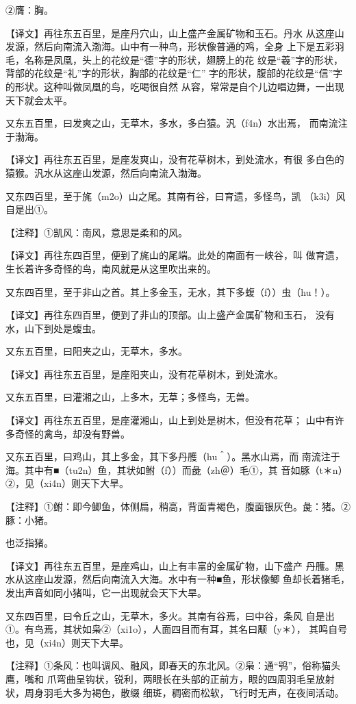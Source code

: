 \documentclass[a4paper,12pt,UTF8,twoside]{ctexbook}
\begin{document}
②膺：胸。

【译文】再往东五百里，是座丹穴山，山上盛产金属矿物和玉石。丹水 从这座山发源，然后向南流入渤海。山中有一种鸟，形状像普通的鸡，全身 上下是五彩羽毛，名称是凤凰，头上的花纹是“德”字的形状，翅膀上的花 纹是“羲”字的形状，背部的花纹是“礼”字的形状，胸部的花纹是“仁” 字的形状，腹部的花纹是“信”字的形状。这种叫做凤凰的鸟，吃喝很自然 从容，常常是自个儿边唱边舞，一出现天下就会太平。

又东五百里，曰发爽之山，无草木，多水，多白猿。汎（f4n）水出焉， 而南流注于渤海。

【译文】再往东五百里，是座发爽山，没有花草树木，到处流水，有很 多白色的猿猴。汎水从这座山发源，然后向南流入渤海。

又东四百里，至于旄（m2o）山之尾。其南有谷，曰育遗，多怪鸟，凯 （k3i）风自是出①。

【注释】①凯风：南风，意思是柔和的风。

【译文】再往东四百里，便到了旄山的尾端。此处的南面有一峡谷，叫 做育遗，生长着许多奇怪的鸟，南风就是从这里吹出来的。

又东四百里，至于非山之首。其上多金玉，无水，其下多蝮（f））虫（hu！）。

【译文】再往东四百里，便到了非山的顶部。山上盛产金属矿物和玉石， 没有水，山下到处是蝮虫。

又东五百里，曰阳夹之山，无草木，多水。

【译文】再往东五百里，是座阳夹山，没有花草树木，到处流水。

又东五百里，曰灌湘之山，上多木，无草；多怪鸟，无兽。

【译文】再往东五百里，是座灌湘山，山上到处是树木，但没有花草； 山中有许多奇怪的禽鸟，却没有野兽。

又东五百里，曰鸡山，其上多金，其下多丹雘（hu＾）。黑水山焉，而 南流注于海。其中有■（tu2n）鱼，其状如鲋（f））而彘（zh＠）毛①，其 音如豚（t＊n）②，见（xi4n）则天下大旱。

【注释】①鲋：即今鲫鱼，体侧扁，稍高，背面青褐色，腹面银灰色。彘：猪。②豚：小猪。

也泛指猪。

【译文】再往东五百里，是座鸡山，山上有丰富的金属矿物，山下盛产 丹雘。黑水从这座山发源，然后向南流入大海。水中有一种■鱼，形状像鲫 鱼却长着猪毛，发出声音如同小猪叫，它一出现就会天下大旱。

又东四百里，曰令丘之山，无草木，多火。其南有谷焉，曰中谷，条风 自是出①。有鸟焉，其状如枭②（xi1o），人面四目而有耳，其名曰颙（y＊）， 其鸣自号也，见（xi4n）则天下大旱。

【注释】①条风：也叫调风、融风，即春天的东北风。②枭：通“鸮”，俗称猫头鹰，嘴和 爪弯曲呈钩状，锐利，两眼长在头部的正前方，眼的四周羽毛呈放射状，周身羽毛大多为褐色，散缀 细斑，稠密而松软，飞行时无声，在夜间活动。
\end{document}
